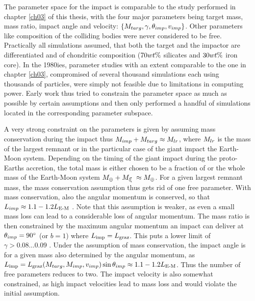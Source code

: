 The parameter space for the impact is comparable to the study performed in chapter \ref{ch03} of this thesis, with the four major parameters being target mass, mass ratio, impact angle and velocity: $\{M_{targ}, \gamma, \theta_{imp}, v_{imp}\}$. Other parameters like composition of the colliding bodies were never considered to be free. Practically all simulations assumed, that both the target and the impactor are differentiated and of chondritic composition ($70 wt\mathrm{\%}$ silicates and $30 wt\mathrm{\%}$ iron core). In the 1980ies, parameter studies with an extent comparable to the one in chapter \ref{ch03}, compromised of several thousand simulations each using thousands of particles, were simply not feasible due to limitations in computing power. Early work \citep{Benz:1985p1755, Benz:1989p1893, Cameron:2000p1854} thus tried to constrain the parameter space as much as possible by certain assumptions and then only performed a handful of simulations located in the corresponding parameter subspace. 

A very strong constraint on the parameters is given by assuming mass conservation during the impact thus $M_{imp} + M_{targ} \approx M_{lr}$, where $M_{lr}$ is the mass of the largest remnant or in the particular case of the giant impact the Earth-Moon system. Depending on the timing of the giant impact during the proto-Earths accretion, the total mass is either chosen to be a fraction of or the whole mass of the Earth-Moon system $\ME + \ML \approx \ME$. For a given largest remnant mass, the mass conservation assumption thus gets rid of one free parameter. With mass conservation, also the angular momentum is conserved, so that $L_{imp} \approx 1.1 - 1.2 L_{\textrm{E-M}}$  \citep{Canup:2001p3295}. Note that this assumption is weaker, as even a small mass loss can lead to a considerable loss of angular momentum. The mass ratio is then constrained by the maximum angular momentum an impact can deliver at $\theta_{imp} = 90 ^\circ$ (or $b = 1$) where $L_{\textrm{imp}} = L_{\textrm{graz}}$. This puts a lower limit of $\gamma > 0.08 \dots 0.09$ \citep{Canup:2001p1861}. Under the assumption of mass conservation, the impact angle is for a given mass also determined by the angular momentum, as $L_{\textrm{imp}} = L_{\textrm{graz}} (M_{targ}, M_{imp}, v_{imp}) \sin{\theta_{imp}} \approx 1.1 - 1.2 L_{\textrm{E-M}}$. Thus the number of free parameters reduces to two. The impact velocity is also somewhat constrained, as high impact velocities lead to mass loss and would violate the initial assumption. 

